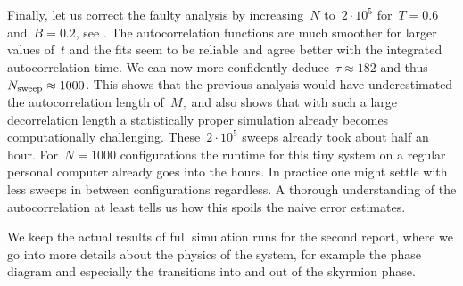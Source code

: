 Finally, let us correct the faulty analysis by increasing~$N$ to~$2\cdot 10^5$
for~$T=0.6$ and~$B=0.2$, see . The autocorrelation
functions are much smoother for larger values of~$t$ and the fits seem to be
reliable and agree better with the integrated autocorrelation time. We can now
more confidently deduce~$\tau \approx 182$ and thus~$N_{\mathrm{sweep}} \approx 1000$. This
shows that the previous analysis would have underestimated the autocorrelation
length of~$M_z$ and also shows that with such a large decorrelation length a
statistically proper simulation already becomes computationally challenging.
These~$2\cdot 10^5$ sweeps already took about half an hour. For~$N=1000$
configurations the runtime for this tiny system on a regular personal computer
already goes into the hours. In practice one might settle with less sweeps in
between configurations regardless. A thorough understanding of the
autocorrelation at least tells us how this spoils the naive error estimates.

We keep the actual results of full simulation runs for the second report, where
we go into more details about the physics of the system, for example the phase
diagram and especially the transitions into and out of the skyrmion phase.

